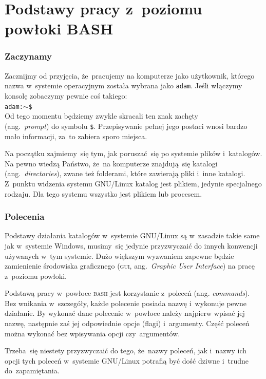 \documentclass[10pt,t]{beamer}
\begin{document}
\section{Podstawy pracy z~poziomu powłoki BASH}



\begin{frame}
  \frametitle{Zaczynamy}


  Zacznijmy od przyjęcia, że~pracujemy na komputerze jako użytkownik,
  którego nazwa w~systemie operacyjnym została wybrana jako \texttt{adam}.
  Jeśli włączymy konsolę zobaczymy pewnie coś takiego: \\
  \texttt{adam:$\sim$\$} \\
  Od tego momentu będziemy zwykle skracali ten znak zachęty \\
  (ang.~\textit{prompt}) do symbolu \texttt{\$}. Przepisywanie pełnej jego
  postaci wnosi bardzo mało informacji, za~to zabiera sporo miejsca.

  Na początku zajmiemy~się tym, jak poruszać~się po systemie plików
  i~katalogów. Na pewno wiedzą Państwo, że~na komputerze znajdują~się
  katalogi (ang.~\textit{directories}), zwane też folderami, które zawierają
  pliki i~inne katalogi. Z~punktu widzenia systemu GNU/Linux
  katalog jest plikiem, jedynie specjalnego rodzaju. Dla tego systemu
  wszystko jest plikiem lub procesem.

\end{frame}





\begin{frame}
  \frametitle{Polecenia}


  Podstawy działania katalogów w~systemie GNU/Linux są w~zasadzie takie
  same jak w~systemie Windows, musimy~się jedynie przyzwyczaić do innych
  konwencji używanych w~tym systemie. Dużo większym wyzwaniem zapewne
  będzie zamienienie środowiska graficznego (\textsc{gui},
  ang.~\textit{Graphic User Interface}) na pracę z~poziomu powłoki.

  Podstawą pracy w~powłoce \textsc{bash} jest korzystanie z~poleceń (ang.
  \textit{commands}). Bez wnikania w~szczegóły, każde polecenie posiada
  nazwę i~wykonuje pewne działanie. By wykonać dane polecenie w~powłoce
  należy najpierw wpisać jej nazwę, następnie zaś jej odpowiednie
  opcje (flagi) i~argumenty. Część poleceń można wykonać bez wpisywania
  opcji czy~argumentów.

  Trzeba~się niestety przyzwyczaić do tego, że~nazwy poleceń, jak i~nazwy
  ich opcji tych poleceń w~systemie GNU/Linux potrafią być dość dziwne
  i~trudne do~zapamiętania.

\end{frame}
\end{document}
